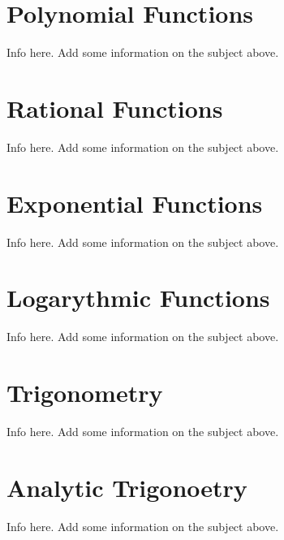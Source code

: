 \documentclass[12pt, letterpaper]{article}
\begin{document}
\section{Polynomial Functions}

Info here. Add some information on the subject above. 

\section{Rational Functions}

Info here. Add some information on the subject above. 

\section{Exponential Functions}

Info here. Add some information on the subject above. 

\section{Logarythmic Functions}

Info here. Add some information on the subject above. 

\section{Trigonometry}

Info here. Add some information on the subject above. 

\section{Analytic Trigonoetry}

Info here. Add some information on the subject above. 
\end{document}
